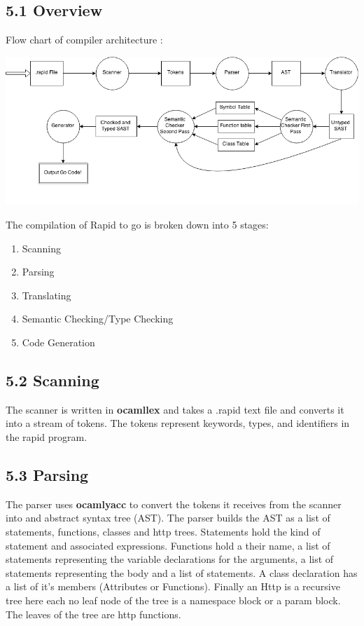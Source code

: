\subsection*{5.1 Overview}

Flow chart of compiler architecture :

\includegraphics[scale=0.5]{arch_flow.png}

The compilation of Rapid to go is broken down into 5 stages:

\begin{enumerate}
\item Scanning
\item Parsing
\item Translating
\item Semantic Checking/Type Checking
\item Code Generation
\end{enumerate}


\subsection*{5.2 Scanning}

The scanner is written in \textbf{ocamllex} and takes a .rapid text file and converts it into a stream of tokens.  The tokens represent keywords, types, and identifiers in the rapid program.

\subsection*{5.3 Parsing}

The parser uses \textbf{ocamlyacc} to convert the tokens it receives from the scanner into and abstract syntax tree (AST).  The parser builds the AST as a list of statements, functions, classes and http trees.  Statements hold the kind of statement and associated expressions.  Functions hold a their name, a list of statements representing the variable declarations for the arguments, a list of statements representing the body and a list of statements. A class declaration has a list of it's members (Attributes or Functions). Finally an Http is a recursive tree here each no leaf node of the tree is a namespace block or a param block.  The leaves of the tree are http functions.  

